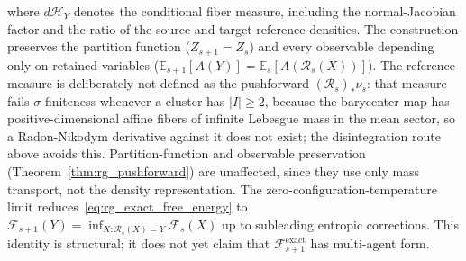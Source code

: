 \documentclass[11pt]{article}
\begin{document}
where $d\mathcal{H}_Y$ denotes the conditional fiber measure, including the normal-Jacobian factor and the ratio of the source and target reference densities. The construction preserves the partition function ($Z_{s+1} = Z_s$) and every observable depending only on retained variables ($\mathbb{E}_{s+1}[A(Y)] = \mathbb{E}_s[A(\mathcal{R}_s(X))]$). The reference measure is deliberately not defined as the pushforward $(\mathcal{R}_s)_*\nu_s$: that measure fails $\sigma$-finiteness whenever a cluster has $|I| \ge 2$, because the barycenter map has positive-dimensional affine fibers of infinite Lebesgue mass in the mean sector, so a Radon-Nikodym derivative against it does not exist; the disintegration route above avoids this. Partition-function and observable preservation (Theorem~\ref{thm:rg_pushforward}) are unaffected, since they use only mass transport, not the density representation. The zero-configuration-temperature limit reduces~\eqref{eq:rg_exact_free_energy} to $\mathcal{F}_{s+1}(Y) = \inf_{X : \mathcal{R}_s(X) = Y} \mathcal{F}_s(X)$ up to subleading entropic corrections. This identity is structural; it does not yet claim that $\mathcal{F}^{\mathrm{exact}}_{s+1}$ has multi-agent form.
\end{document}
